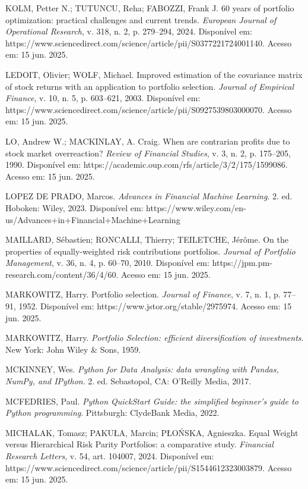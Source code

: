 \noindent
KOLM, Petter N.; TUTUNCU, Reha; FABOZZI, Frank J. 60 years of portfolio optimization: practical challenges and current trends. \textit{European Journal of Operational Research}, v. 318, n. 2, p. 279--294, 2024. Disponível em: https://www.sciencedirect.com/science/article/pii/S0377221724001140. Acesso em: 15 jun. 2025.

\noindent
LEDOIT, Olivier; WOLF, Michael. Improved estimation of the covariance matrix of stock returns with an application to portfolio selection. \textit{Journal of Empirical Finance}, v. 10, n. 5, p. 603--621, 2003. Disponível em: https://www.sciencedirect.com/science/article/pii/S0927539803000070. Acesso em: 15 jun. 2025.

\noindent
LO, Andrew W.; MACKINLAY, A. Craig. When are contrarian profits due to stock market overreaction? \textit{Review of Financial Studies}, v. 3, n. 2, p. 175--205, 1990. Disponível em: https://academic.oup.com/rfs/article/3/2/175/1599086. Acesso em: 15 jun. 2025.

\noindent
LOPEZ DE PRADO, Marcos. \textit{Advances in Financial Machine Learning}. 2. ed. Hoboken: Wiley, 2023. Disponível em: https://www.wiley.com/en-us/Advances+in+Financial+Machine+Learning%

\noindent
MAILLARD, Sébastien; RONCALLI, Thierry; TEILETCHE, Jérôme. On the properties of equally-weighted risk contributions portfolios. \textit{Journal of Portfolio Management}, v. 36, n. 4, p. 60--70, 2010. Disponível em: https://jpm.pm-research.com/content/36/4/60. Acesso em: 15 jun. 2025.

\noindent
MARKOWITZ, Harry. Portfolio selection. \textit{Journal of Finance}, v. 7, n. 1, p. 77--91, 1952. Disponível em: https://www.jstor.org/stable/2975974. Acesso em: 15 jun. 2025.

\noindent
MARKOWITZ, Harry. \textit{Portfolio Selection: efficient diversification of investments}. New York: John Wiley \& Sons, 1959.

\noindent
MCKINNEY, Wes. \textit{Python for Data Analysis: data wrangling with Pandas, NumPy, and IPython}. 2. ed. Sebastopol, CA: O'Reilly Media, 2017.

\noindent
MCFEDRIES, Paul. \textit{Python QuickStart Guide: the simplified beginner's guide to Python programming}. Pittsburgh: ClydeBank Media, 2022.

\noindent
MICHALAK, Tomasz; PAKUŁA, Marcin; PŁOŃSKA, Agnieszka. Equal Weight versus Hierarchical Risk Parity Portfolios: a comparative study. \textit{Financial Research Letters}, v. 54, art. 104007, 2024. Disponível em: https://www.sciencedirect.com/science/article/pii/S1544612323003879. Acesso em: 15 jun. 2025.

